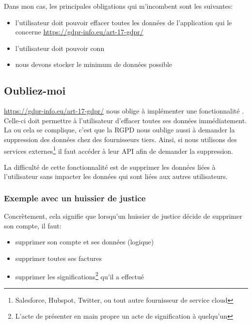 \documentclass[]{report}
\begin{document}

    Dans mon cas, les principales obligations qui m'incombent sont les suivantes:

    \begin{itemize}
      \item l'utilisateur doit pouvoir effacer toutes les données de l'application qui le concerne \href{Chapitre 3, Article 17}{https://gdpr-info.eu/art-17-gdpr/}
      \item l'utilisateur doit pouvoir conn
      \item nous devons stocker le minimum de données possible
    \end{itemize}


    \subsection{Oubliez-moi}

      \href{L'article 17 de la RGPD}{https://gdpr-info.eu/art-17-gdpr/} nous oblige à implémenter une fonctionnalité . Celle-ci doit permettre à l'utilisateur d'effacer toutes ses données immédiatement. La ou cela se complique, c'est que la RGPD nous oublige aussi à demander la suppression des données chez des fournisseurs tiers. Ainsi, si nous utilisons des services externes\footnote{Salesforce, Hubspot, Twitter, ou tout autre fournisseur de service cloud} il faut accéder à leur API afin de demander la suppression.

      La difficulté de cette fonctionnalité est de supprimer les données liées à l'utilisateur sans impacter les données qui sont liées aux autres utilisateurs.

      \subsubsection{Exemple avec un huissier de justice}

        Concrètement, cela signifie que lorsqu'un huissier de justice décide de supprimer son compte, il faut:

        \begin{itemize}
          \item supprimer son compte et ses données (logique)
          \item supprimer toutes ses factures
          \item supprimer les significations\footnote{L'acte de présenter en main propre un acte de signification à quelqu'un} qu'il a effectué
        \end{itemize}
\end{document}
